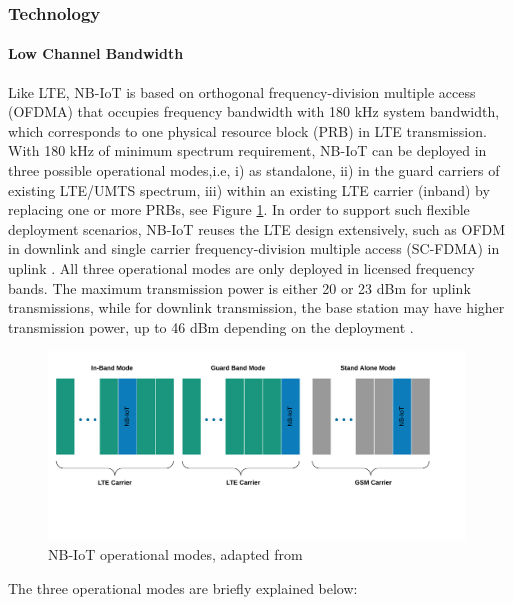 \documentclass[12pt]{article}
\begin{document}
\subsubsection{Technology}\label{NB-IoT Technology}
\paragraph{Low Channel Bandwidth}

Like LTE, NB-IoT is based on orthogonal frequency-division multiple access (OFDMA) that occupies frequency bandwidth with 180 kHz system bandwidth, which corresponds to one physical resource block (PRB) in LTE transmission. With 180 kHz of minimum spectrum requirement, NB-IoT can be deployed in three possible operational modes,i.e, i) as standalone, ii) in the guard carriers of existing LTE/UMTS spectrum, iii) within an existing LTE carrier (inband) by replacing one or more PRBs, see Figure \ref{fig:NB-IoT operational modes}. In order to support such flexible deployment scenarios, NB-IoT reuses the LTE design extensively, such as OFDM in downlink and single carrier frequency-division multiple access (SC-FDMA) in uplink \cite{8612009,malik2018radio,sinha2017survey,boisguene2017survey}. All three operational modes are only deployed  in licensed frequency bands. The maximum transmission power is either 20 or 23 dBm for uplink transmissions, while for downlink transmission, the base station may have higher transmission power, up to 46 dBm depending on the deployment \cite{farrell2018low}.\par
\begin{figure}[H]
    \centering
    \includegraphics[width=0.9\columnwidth, height=5cm, keepaspectratio]{Images/nbiotModes.pdf}
    \caption{NB-IoT operational modes, adapted from \cite{xu2017narrowband}}
    \label{fig:NB-IoT operational modes}
\end{figure}
The three operational modes are briefly explained below:
\renewcommand{\labelenumi}{\roman{enumi}}
\end{document}
